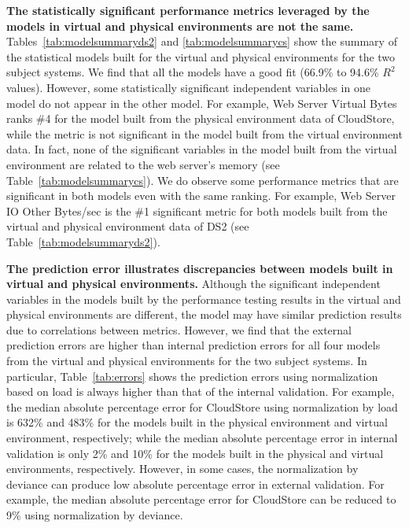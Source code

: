 \documentclass[smallextended]{svjour3}       %
\begin{document}
\noindent \textbf{The statistically significant performance metrics leveraged by the models in virtual and physical environments are not the same.} Tables~\ref{tab:modelsummaryds2} and \ref{tab:modelsummarycs} show the summary of the statistical models built for the virtual and physical environments for the two subject systems. We find that all the models have a good fit (66.9\% to 94.6\% $R^2$ values). However, some statistically significant independent variables in one model do not appear in the other model. For example, Web Server Virtual Bytes ranks \#4 for the model built from the physical environment data of CloudStore, while the metric is not significant in the model built from the virtual environment data. In fact, none of the significant variables in the model built from the virtual environment are related to the web server's memory (see Table~\ref{tab:modelsummarycs}). We do observe some performance metrics that are significant in both models even with the same ranking. For example, Web Server IO Other Bytes/sec is the \#1 significant metric for both models built from the virtual and physical environment data of DS2 (see Table~\ref{tab:modelsummaryds2}). 

\noindent \textbf{The prediction error illustrates discrepancies between models built in virtual and physical environments.} Although the significant independent variables in the models built by the performance testing results in the virtual and physical environments are different, the model may have similar prediction results due to correlations between metrics. However, we find that the external prediction errors are higher than internal prediction errors for all four models from the virtual and physical environments for the two subject systems. In particular, Table~\ref{tab:errors} shows the prediction errors using normalization based on load is always higher than that of the internal validation. For example, the median absolute percentage error for CloudStore using normalization by load is 632\% and 483\% for the models built in the physical environment and virtual environment, respectively; while the median absolute percentage error in internal validation is only 2\% and 10\% for the models built in the physical and virtual environments, respectively. However, in some cases, the normalization by deviance can produce low absolute percentage error in external validation. For example, the median absolute percentage error for CloudStore can be reduced to 9\% using normalization by deviance. 
\end{document}
